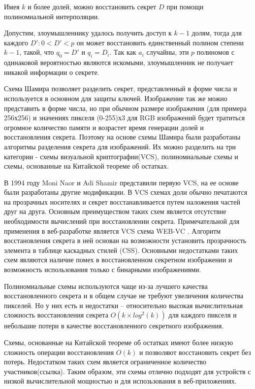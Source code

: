 \documentclass[a4paper,article,14pt]{extarticle}
\begin{document}
Имея $k$ и более долей, можно восстановить секрет $D$ при помощи полиномиальной интерполяции.

Допустим, злоумышленнику удалось получить доступ к $k-1$ долям, тогда для каждого $D': 0<D'<p$ он может восстановить единственный полином степени $k-1$, такой, что $q_0=D'$ и 
$q_i=D_i$. Так как $a_i$ случайны, эти $p$ полиномов с одинаковой вероятностью являются искомыми, злоумышленник не получает никакой
информации о секрете. 

Схема Шамира позволяет разделить секрет, представленный в форме числа и используется в основном для защиты ключей. Изображение так же 
можно представить в форме числа, но при обычном размере изображения (для примера 256х256) и значениях пикселя (0-255)х3 для RGB изображений
будет тратиться огромное количество памяти и возрастет время генерации долей и восстановления секрета. Поэтому на основе схемы Шамира были разработаны алгоритмы разделения секрета для изображений. 
Их можно разделить на три категории - схемы визуальной криптографии(VCS), полиномиальные схемы и схемы, основанные на Китайской теореме об остатках. 

В 1994 году Moni Naor и Adi Shamir \cite{shamir_VCS} представили первую VCS, на ее основе были разработаны другие модификации.
В VCS схемах доли обычно печатаются на прозрачных носителях и секрет восстанавливается путем наложения частей друг на друга. 
Основным преимуществом таких схем является отсутствие необходимости вычислений при восстановлении секрета.
Примечательной для применения в веб-разработке является VCS схема WEB-VC \cite{WEB-VC}. Алгоритм восстановления секрета в ней основан 
на возможности установить прозрачность элемента в таблице каскадных стилей (CSS). Основными недостатками таких схем являются 
наличие помех в восстановленном секретном изображении и возможность использования только с бинарными изображениями.

Полиномиальные схемы используются чаще из-за лучшего качества восстановленного секрета и в общем случае 
не требуют увеличения количества пикселей. Но у них есть и недостатки -- относительно высокая вычислительная сложность 
восстановления секрета $O(k \times log^2(k))$ для каждого пикселя и небольшие потери в качестве восстановленного секретного изображения.

Схемы, основанные на Китайской теореме об остатках имеют более низкую сложность операции восстановления $O(k)$ и позволяют 
восстановить секрет без потерь. Недостатком таких схем является ограниченное количество участников(ссылка). Таким образом, 
эти схемы отлично подходят для устройств с низкой вычислительной мощностью и для испозьзования в веб-приложениях.
\end{document}
